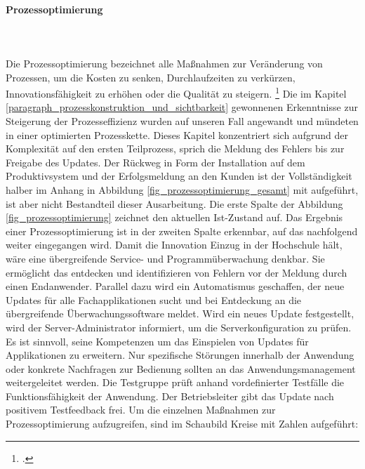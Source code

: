 \paragraph{Prozessoptimierung}\mbox{}\\\\
\label{paragraph_prozessoptimierung}
Die Prozessoptimierung bezeichnet alle Maßnahmen zur Veränderung von Prozessen, um die Kosten zu senken, Durchlaufzeiten zu verkürzen, Innovationsfähigkeit zu erhöhen oder die Qualität zu steigern. \footcite[Vgl.][280]{heinrich_stelzer_2011}
Die im Kapitel \ref{paragraph_prozesskonstruktion_und_sichtbarkeit} gewonnenen Erkenntnisse zur Steigerung der Prozesseffizienz wurden auf unseren Fall angewandt und mündeten in einer optimierten Prozesskette. Dieses Kapitel konzentriert sich aufgrund der Komplexität auf den ersten Teilprozess, sprich die Meldung des Fehlers bis zur Freigabe des Updates. Der Rückweg in Form der Installation auf dem Produktivsystem und der Erfolgsmeldung an den Kunden ist der Vollständigkeit halber im Anhang in Abbildung \ref{fig_prozessoptimierung_gesamt} mit aufgeführt, ist aber nicht Bestandteil dieser Ausarbeitung.
Die erste Spalte der Abbildung \ref{fig_prozessoptimierung} zeichnet den aktuellen Ist-Zustand auf. Das Ergebnis einer Prozessoptimierung ist in der zweiten Spalte erkennbar, auf das nachfolgend weiter eingegangen wird. Damit die Innovation Einzug in der Hochschule hält, wäre eine übergreifende Service- und Programmüberwachung denkbar. Sie ermöglicht das entdecken und identifizieren von Fehlern vor der Meldung durch einen Endanwender. Parallel dazu wird ein Automatismus geschaffen, der neue Updates für alle Fachapplikationen sucht und bei Entdeckung an die übergreifende Überwachungssoftware meldet. Wird ein neues Update festgestellt, wird der Server-Administrator informiert, um die Serverkonfiguration zu prüfen. Es ist sinnvoll, seine Kompetenzen um das Einspielen von Updates für Applikationen zu erweitern. Nur spezifische Störungen innerhalb der Anwendung oder konkrete Nachfragen zur Bedienung sollten an das Anwendungsmanagement weitergeleitet werden.  Die Testgruppe prüft anhand vordefinierter Testfälle die Funktionsfähigkeit der Anwendung. Der Betriebsleiter gibt das Update nach positivem Testfeedback frei.
Um die einzelnen Maßnahmen zur Prozessoptimierung aufzugreifen, sind im Schaubild Kreise mit Zahlen aufgeführt:

